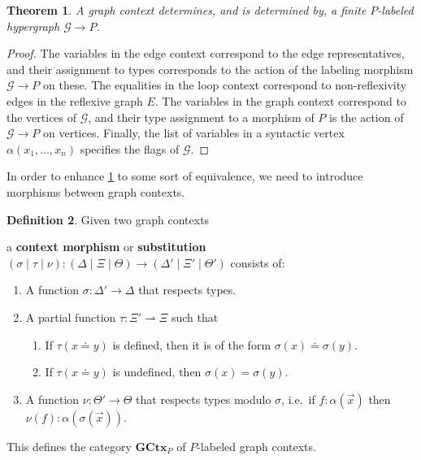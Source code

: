 \documentclass{article}
\newtheorem{thm}{Theorem}[section]
\theoremstyle{definition}
\newtheorem{defn}[thm]{Definition}
\theoremstyle{remark}
\def\G{\mathcal{G}}
\def\GCtx{\mathbf{GCtx}}
\def\graph{\;\mathsf{graph}}
\let\types\vdash
\begin{document}
\begin{thm}\label{thm:ctx-hy}
  A graph context determines, and is determined by, a finite $P$-labeled hypergraph $\G\to P$.
\end{thm}
\begin{proof}
  The variables in the edge context correspond to the edge representatives, and their assignment to types corresponds to the action of the labeling morphism $\G\to P$ on these.
  The equalities in the loop context correspond to non-reflexivity edges in the reflexive graph $E$.
  The variables in the graph context correspond to the vertices of $\G$, and their type assignment to a morphism of $P$ is the action of $\G\to P$ on vertices.
  Finally, the list of variables in a syntactic vertex $\alpha(x_1,\dots,x_n)$ specifies the flags of $\G$.
\end{proof}

In order to enhance \cref{thm:ctx-hy} to some sort of equivalence, we need to introduce morphisms between graph contexts.

\begin{defn}
  Given two graph contexts
  a \textbf{context morphism} or \textbf{substitution} $(\sigma\mid\tau\mid\nu):(\Delta\mid\Xi\mid\Theta)\to(\Delta'\mid\Xi'\mid\Theta')$ consists of:
  \begin{enumerate}
  \item A function $\sigma : \Delta' \to \Delta$ that respects types.
  \item A partial function $\tau : \Xi' \rightharpoonup \Xi$ such that
    \begin{enumerate}
    \item If $\tau(x\doteq y)$ is defined, then it is of the form $\sigma(x)\doteq \sigma(y)$.
    \item If $\tau(x\doteq y)$ is undefined, then $\sigma(x)=\sigma(y)$.
    \end{enumerate}
  \item A function $\nu : \Theta' \to \Theta$ that respects types modulo $\sigma$, i.e.\ if $f:\alpha(\vec x)$ then $\nu(f) : \alpha(\sigma(\vec x))$.
  \end{enumerate}
  This defines the category $\GCtx_P$ of $P$-labeled graph contexts.
\end{defn}
\end{document}
